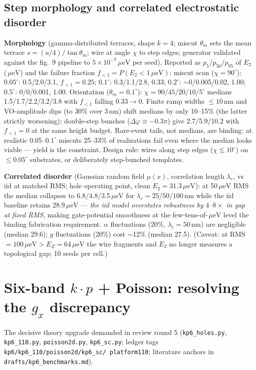 \documentclass[11pt]{article}
\newcommand{\ueV}{\,\mu\mathrm{eV}}
\begin{document}
\subsection{Step morphology and correlated electrostatic disorder}
\label{s:morph}
\textbf{Morphology} (gamma-distributed terraces, shape $k = 4$; miscut
$\theta_m$ sets the mean terrace $s = (a/4)/\tan\theta_m$; wire at angle
$\chi$ to step edges; generator validated against the fig.~9 pipeline to
$5\times10^{-7}\ueV$ per seed). Reported as $p_5/p_{50}/p_{95}$ of $E_2$
($\ueV$) and the failure fraction $f_{<1} = P(E_2 < 1\ueV)$:
miscut scan ($\chi = 90^\circ$): $0.05^\circ$: 0.5/2.0/3.1, $f_{<1}=0.25$;
$0.1^\circ$: 0.3/1.1/2.8, 0.33; $0.2^\circ$: $\sim$0/0.005/0.02, 1.00;
$0.5^\circ$: 0/0/0.001, 1.00. Orientation ($\theta_m = 0.1^\circ$):
$\chi = 90/45/20/10/5^\circ$ medians 1.5/1.7/2.2/3.2/3.8 with $f_{<1}$
falling $0.33 \to 0$. Finite ramp widths $\le 10$\,nm and VO-amplitude
dips (to 30\% over 3\,nm) shift medians by only 10--15\% (the latter
strictly worsening); double-step bunches ($\Delta\varphi \equiv -0.3\pi$)
give 2.7/5.9/10.2 with $f_{<1} = 0$ at the same height budget. Rare-event
tails, not medians, are binding: at realistic 0.05--$0.1^\circ$ miscuts
25--33\% of realizations fail even where the median looks viable ---
yield is the constraint. Design rule: wires along step edges
($\chi \lesssim 10^\circ$) on $\le 0.05^\circ$ substrates, or
deliberately step-bunched templates.

\textbf{Correlated disorder} (Gaussian random field $\mu(x)$, correlation
length $\lambda_c$, vs iid at matched RMS; hole operating point, clean
$E_2 = 31.3\ueV$): at 50$\ueV$ RMS the median collapses to
6.8/4.8/3.5$\ueV$ for $\lambda_c = 25/50/100$\,nm while the iid baseline
retains 28.9$\ueV$ --- \emph{the iid model overstates robustness by
$4$--$8\times$ in gap at fixed RMS}, making gate-potential smoothness at
the few-tens-of-$\ueV$ level the binding fabrication requirement.
$\alpha$ fluctuations (20\%, $\lambda_c = 50$\,nm) are negligible
(median 29.6); $g$ fluctuations (20\%) cost $\sim$12\% (median 27.5).
(Caveat: at RMS $= 100\ueV > E_Z = 64\ueV$ the wire fragments and $E_2$
no longer measures a topological gap; 10 seeds per cell.)

\section{Six-band $k\cdot p$ + Poisson: resolving the $g_x$ discrepancy}
\label{s:kp6}
The decisive theory upgrade demanded in review round 5
(\texttt{kp6\_holes.py}, \texttt{kp6\_110.py}, \texttt{poisson2d.py},
\texttt{kp6\_sc.py}; ledger tags \texttt{kp6/kp6\_110/poisson2d/kp6\_sc/
platform110}; literature anchors in \texttt{drafts/kp6\_benchmarks.md}).
\end{document}
